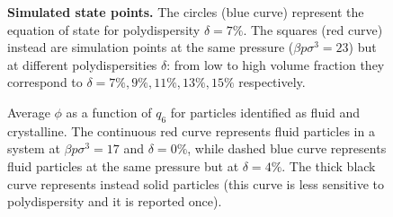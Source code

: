 \documentclass[twocolumn,superscriptaddress]{revtex4-1}
\begin{document}
\tikzset{external/force remake}
\begin{figure}
	\caption{\textbf{Simulated state points.} The circles (blue curve) represent the equation of state for polydispersity $\delta=7\%$. The squares (red curve) instead are simulation points at the same pressure ($\beta p\sigma^3=23$) but at different polydispersities $\delta$: from low to high volume fraction they correspond to $\delta=7\%,9\%,11\%,13\%,15\%$ respectively.}
	\label{fig:eos}
\end{figure}

\tikzset{external/force remake}
\begin{figure}
	 \caption{Average $\phi$ as a function of $q_6$ for particles identified as fluid and crystalline. The continuous red curve represents fluid particles in a system at $\beta p\sigma^3=17$ and $\delta=0\%$, while dashed blue curve represents fluid particles at the same pressure but at $\delta=4\%$. The thick black curve represents instead solid particles (this curve is less sensitive to polydispersity and it is reported once).}
 \label{fig:stability_map}
\end{figure}
\end{document}
